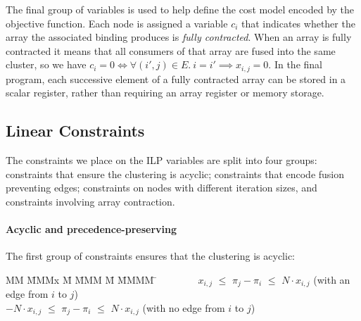 The final group of variables is used to help define the cost model encoded by the objective function. Each node is assigned a variable $c_i$ that indicates whether the array the associated binding produces is \emph{fully contracted}. When an array is fully contracted it means that all consumers of that array are fused into the same cluster, so we have $c_i = 0 \iff \forall (i',j) \in E.\ i = i' \implies x_{i,j} = 0$. In the final program, each successive element of a fully contracted array can be stored in a scalar register, rather than requiring an array register or memory storage. 


\subsection{Linear Constraints}
\label{clustering:s:LinearConstraints}
The constraints we place on the ILP variables are split into four groups: constraints that ensure the clustering is acyclic; constraints that encode fusion preventing edges; constraints on nodes with different iteration sizes, and constraints involving array contraction. 



\paragraph{Acyclic and precedence-preserving} The first group of constraints ensures that the clustering is acyclic:
\begin{tabbing}
MM  \= MMMx \= M \= MMM \= M \= MMMM \= \kill
    \> ~~~~~~~ $x_{i,j}$ \> $\le$ \> $\pi_j - \pi_i$ \> $\le$ \> $N \cdot x_{i,j}$ 
    \>             (with an edge from $i$ to $j$)            \\
    \> $-N \cdot  x_{i,j}$  \> $\le$ \> $\pi_j - \pi_i$ \> $\le$ \> $N \cdot x_{i,j}$ 
    \>             (with no edge from $i$ to $j$)
\end{tabbing}

